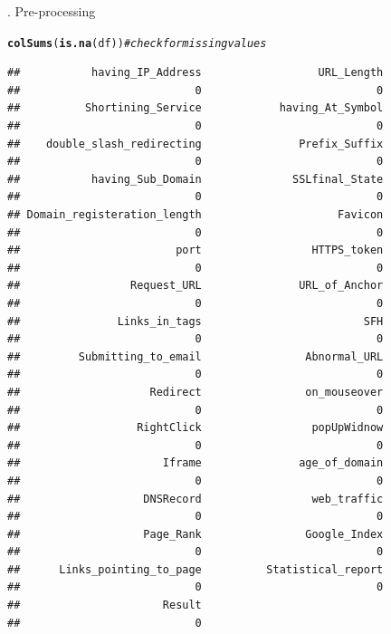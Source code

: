 \documentclass{article}\usepackage[]{graphicx}\usepackage[]{color}
\makeatletter
\newcommand{\hlcom}[1]{\textcolor[rgb]{0.678,0.584,0.686}{\textit{#1}}}%
\newcommand{\hlstd}[1]{\textcolor[rgb]{0.345,0.345,0.345}{#1}}%
\newcommand{\hlkwd}[1]{\textcolor[rgb]{0.737,0.353,0.396}{\textbf{#1}}}%
\newenvironment{kframe}{%
 \def\at@end@of@kframe{}%
 \ifinner\ifhmode%
  \def\at@end@of@kframe{\end{minipage}}%
  \begin{minipage}{\columnwidth}%
 \fi\fi%
 \def\FrameCommand##1{\hskip\@totalleftmargin \hskip-\fboxsep
 \colorbox{shadecolor}{##1}\hskip-\fboxsep
     \hskip-\linewidth \hskip-\@totalleftmargin \hskip\columnwidth}%
 \MakeFramed {\advance\hsize-\width
   \@totalleftmargin\z@ \linewidth\hsize
   \@setminipage}}%
 {\par\unskip\endMakeFramed%
 \at@end@of@kframe}
\newenvironment{knitrout}{}{} %
\makeatother
\begin{document}
\newline
\newline
\newline
\newline
{}. Pre-processing
\begin{knitrout}
\color{fgcolor}\begin{kframe}
\begin{alltt}
 \hlkwd{colSums}\hlstd{(}\hlkwd{is.na}\hlstd{(df))} \hlcom{# check for missing values }
\end{alltt}
\begin{verbatim}
##           having_IP_Address                  URL_Length 
##                           0                           0 
##          Shortining_Service            having_At_Symbol 
##                           0                           0 
##    double_slash_redirecting               Prefix_Suffix 
##                           0                           0 
##           having_Sub_Domain              SSLfinal_State 
##                           0                           0 
## Domain_registeration_length                     Favicon 
##                           0                           0 
##                        port                 HTTPS_token 
##                           0                           0 
##                 Request_URL               URL_of_Anchor 
##                           0                           0 
##               Links_in_tags                         SFH 
##                           0                           0 
##         Submitting_to_email                Abnormal_URL 
##                           0                           0 
##                    Redirect                on_mouseover 
##                           0                           0 
##                  RightClick                 popUpWidnow 
##                           0                           0 
##                      Iframe               age_of_domain 
##                           0                           0 
##                   DNSRecord                 web_traffic 
##                           0                           0 
##                   Page_Rank                Google_Index 
##                           0                           0 
##      Links_pointing_to_page          Statistical_report 
##                           0                           0 
##                      Result 
##                           0
\end{verbatim}
\end{kframe}
\end{knitrout}
\end{document}

